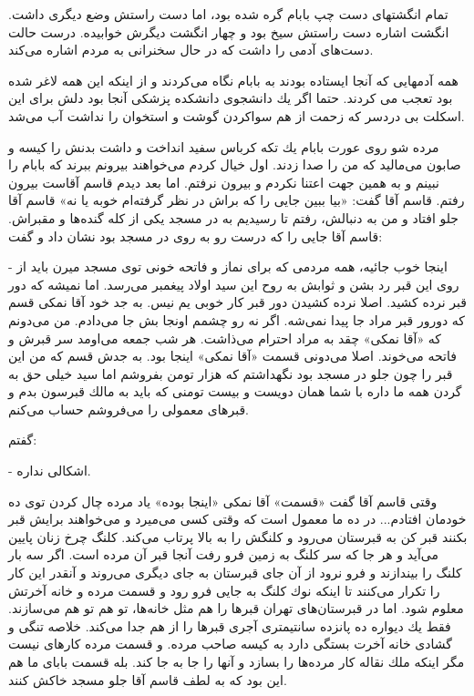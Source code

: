 \documentclass[12pt,a4paper]{book}
\begin{document}
تمام انگشتهای دست چپ بابام گره شده بود، اما دست راستش وضع دیگری داشت. انگشت اشاره دست راستش سیخ بود و چهار انگشت دیگرش خوابیده. درست حالت دست‌های آدمی را داشت که در حال سخنرانی به مردم اشاره می‌کند.

همه آدمهایی که آنجا ایستاده بودند به بابام نگاه می‌کردند و از اینکه این همه لاغر شده بود تعجب می کردند. حتما اگر يك دانشجوی دانشکده پزشکی آنجا بود دلش برای این اسکلت بی دردسر که زحمت
از هم سواکردن گوشت و استخوان را نداشت آب می‌شد.

مرده شو روی عورت بابام يك تكه كرباس سفید انداخت و داشت بدنش را کيسه و صابون می‌مالید که من را صدا زدند. اول خیال کردم می‌خواهند بيرونم ببرند که بابام را نبینم و به همین جهت اعتنا نکردم و بیرون نرفتم. اما بعد دیدم قاسم آقاست بیرون رفتم. قاسم آقا گفت: «بیا ببین جایی را که براش در نظر گرفته‌ام خوبه یا نه» قاسم آقا جلو افتاد و من به دنبالش، رفتم تا رسیدیم به در مسجد یکی از کله گنده‌ها و مقبراش. قاسم آقا جایی را که درست رو به روی در مسجد بود نشان داد و گفت:

- اینجا خوب جائیه، همه مردمی که برای نماز و فاتحه خونی توی مسجد میرن باید از روی این قبر رد بشن و ثوابش به روح این سید اولاد پیغمبر می‌رسد. اما نمیشه که دور قبر نرده کشید. اصلا نرده کشیدن دور قبر کار خوبی یم نیس. به جد خود آقا نمکی قسم که دورور قبر مراد جا پیدا نمی‌شه. اگر نه رو چشمم اونجا بش جا می‌دادم. من می‌دونم که «آقا نمکی» چقد به مراد احترام می‌ذاشت. هر شب جمعه می‌اومد سر قبرش و فاتحه می‌خوند. اصلا می‌دونی قسمت «آقا نمکی» اینجا بود. به جدش قسم که من این قبر را چون جلو در مسجد بود نگهداشتم که هزار تومن بفروشم اما سید خیلی حق به گردن همه ما داره با شما همان دویست و بیست تومنی که باید به مالك قبرسون بدم و قبر‌های معمولی را می‌فروشم حساب می‌کنم.

گفتم:

- اشکالی نداره.

وقتی قاسم آقا گفت «قسمت» آقا نمکی «اینجا بوده» یاد مرده چال کردن توی ده خودمان افتادم... در ده ما معمول است که وقتی کسی می‌میرد و می‌خواهند برایش قبر بکنند قبر کن به قبرستان می‌رود و کلنگش را به بالا پرتاب می‌کند. کلنگ چرخ زنان پایین می‌آید و هر جا که سر کلنگ به زمین فرو رفت آنجا قبر آن مرده است. اگر سه بار کلنگ را بیندازند و فرو نرود از آن جای قبرستان به جای دیگری می‌روند و آنقدر این کار را تکرار می‌کنند تا اینکه نوك کلنگ به جایی فرو رود و قسمت مرده و خانه آخرتش معلوم شود. اما در قبرستان‌های تهران قبرها را هم مثل خانه‌ها، تو هم تو هم می‌سازند. فقط يك ديواره ده پانزده سانتیمتری آجری قبرها را از هم جدا می‌کند. خلاصه تنگی و گشادی خانه آخرت بستگی دارد به کیسه صاحب مرده. و قسمت مرده کارهای نیست مگر اینکه ملك نقاله کار مرده‌ها را بسازد و آنها را جا به جا کند. بله قسمت بابای ما هم این بود که به لطف قاسم آقا جلو مسجد خاکش کنند.
\end{document}
